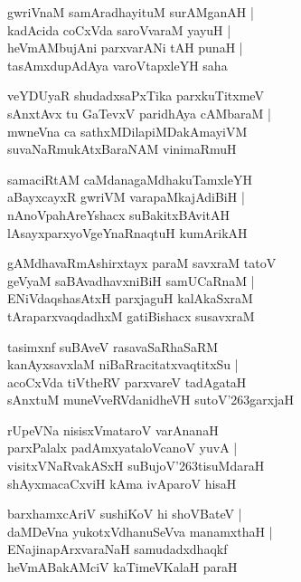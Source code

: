 \documentclass[twoside,12pt,openright]{book}
\def\S{\char'263}
\newcounter{shloka}[chapter]
\begin{document}
\begin{shloka}
gwriVnaM samAradhayituM surAMganAH |\\
kadAcida coCxVda saroVvaraM yayuH |\\
heVmAMbujAni parxvarANi tAH punaH |\\
tasAmxdupAdAya varoVtapxleYH saha 
\end{shloka}

\begin{shloka}
veYDUyaR shudadxsaPxTika parxkuTitxmeV \\
sAnxtAvx tu GaTevxV paridhAya cAMbaraM |\\
mwneVna ca sathxMDilapiMDakAmayiVM\\
suvaNaRmukAtxBaraNAM vinimaRmuH
\end{shloka}

\begin{shloka}
samaciRtAM caMdanagaMdhakuTamxleYH \\
aBayxcayxR gwriVM varapaMkajAdiBiH |\\
nAnoVpahAreYshacx suBakitxBAvitAH \\
lAsayxparxyoVgeYnaRnaqtuH kumArikAH 
\end{shloka}

\begin{shloka}
gAMdhavaRmAshirxtayx paraM savxraM tatoV\\
geVyaM saBAvadhavxniBiH samUCaRnaM |\\
ENiVdaqshasAtxH parxjaguH kalAkaSxraM \\
tAraparxvaqdadhxM gatiBishacx susavxraM 
\end{shloka}

\begin{shloka}
tasimxnf suBAveV rasavaSaRhaSaRM \\
kanAyxsavxlaM niBaRracitatxvaqtitxSu |\\
acoCxVda tiVtheRV parxvareV tadAgataH \\
sAnxtuM muneVveRVdanidheVH sutoV\S garxjaH
\end{shloka}

\begin{shloka}
rUpeVNa nisisxVmataroV varAnanaH \\
parxPalalx padAmxyataloVcanoV yuvA |\\
visitxVNaRvakASxH suBujoV\S tisuMdaraH \\
shAyxmacaCxviH kAma ivAparoV hisaH
\end{shloka}

\begin{shloka}
barxhamxcAriV sushiKoV hi shoVBateV |\\
daMDeVna yukotxVdhanuSeVva manamxthaH |\\
ENajinapArxvaraNaH samudadxdhaqkf \\
heVmABakAMciV kaTimeVKalaH paraH 
\end{shloka}
\end{document}
